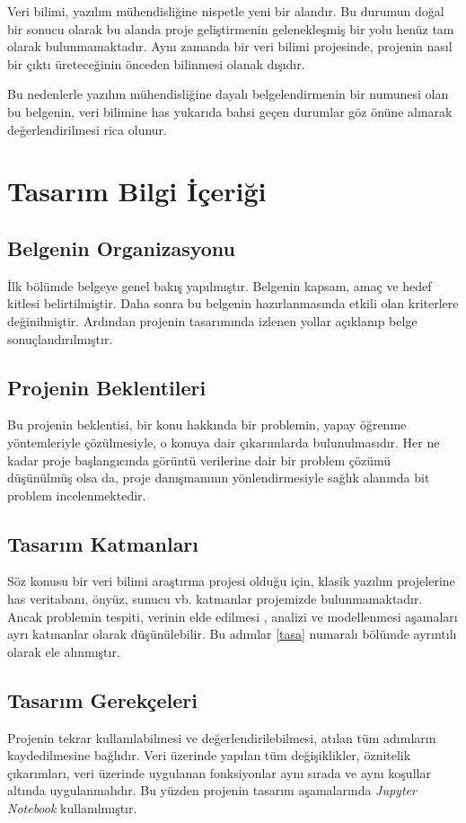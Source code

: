 \documentclass[12pt,a4paper]{article}
\begin{document}
    Veri bilimi, yazılım mühendisliğine nispetle yeni bir alandır. Bu durumun
    doğal bir sonucu olarak bu alanda proje geliştirmenin gelenekleşmiş bir
    yolu henüz tam olarak bulunmamaktadır. Aynı zamanda bir veri bilimi
    projesinde, projenin nasıl bir çıktı üreteceğinin önceden bilinmesi
    olanak dışıdır. 
    
    Bu nedenlerle yazılım mühendisliğine dayalı belgelendirmenin bir
    numunesi olan bu belgenin, veri bilimine has yukarıda bahsi geçen
    durumlar göz önüne alınarak değerlendirilmesi rica olunur.\cite{byrne}

    \section{Tasarım Bilgi İçeriği}
    \subsection{Belgenin Organizasyonu}
    İlk bölümde belgeye genel bakış yapılmıştır. Belgenin kapsam, amaç ve 
    hedef kitlesi belirtilmiştir. Daha sonra bu belgenin hazırlanmasında
    etkili olan kriterlere değinilmiştir. Ardından projenin tasarımında izlenen
    yollar açıklanıp belge sonuçlandırılmıştır.

    \subsection{Projenin Beklentileri}
    Bu projenin beklentisi, bir konu hakkında bir problemin, yapay öğrenme
    yöntemleriyle çözülmesiyle, o konuya dair çıkarımlarda bulunulmasıdır.
    Her ne kadar proje başlangıcında görüntü verilerine dair bir problem
    çözümü düşünülmüş olsa da, proje danışmanının yönlendirmesiyle sağlık alanında
    bit problem incelenmektedir.

    \subsection{Tasarım Katmanları}
    Söz konusu bir veri bilimi araştırma projesi olduğu için,
    klasik yazılım projelerine has veritabanı, önyüz, sunucu vb. katmanlar
    projemizde bulunmamaktadır. Ancak problemin tespiti, verinin elde edilmesi
    , analizi ve modellenmesi aşamaları ayrı katmanlar olarak düşünülebilir.
    Bu adımlar \ref{tasa} numaralı bölümde ayrıntılı olarak ele alınmıştır.

    \subsection{Tasarım Gerekçeleri}
    Projenin tekrar kullanılabilmesi ve değerlendirilebilmesi, atılan tüm
    adımların kaydedilmesine bağlıdır. Veri üzerinde yapılan tüm değişiklikler,
    öznitelik çıkarımları, veri üzerinde uygulanan fonksiyonlar aynı sırada
    ve aynı koşullar altında uygulanmalıdır. Bu yüzden projenin tasarım
    aşamalarında \textit{Jupyter Notebook} kullanılmıştır.
\end{document}
